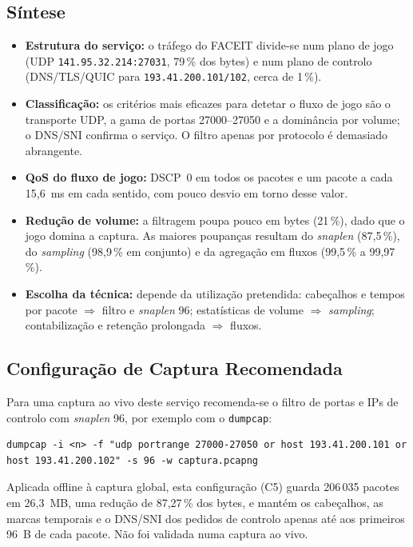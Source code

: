 \documentclass[11pt,a4paper]{article}
\begin{document}
\subsection{Síntese}
\begin{itemize}
  \item \textbf{Estrutura do serviço:} o tráfego do FACEIT divide-se num plano de jogo (UDP \texttt{141.95.32.214:27031}, 79\,\%
        dos bytes) e num plano de controlo (DNS/TLS/QUIC para \texttt{193.41.200.101/102}, cerca de 1\,\%).
  \item \textbf{Classificação:} os critérios mais eficazes para detetar o fluxo de jogo são o transporte UDP, a gama de portas
        27000--27050 e a dominância por volume; o DNS/SNI confirma o serviço. O filtro apenas por protocolo é demasiado abrangente.
  \item \textbf{QoS do fluxo de jogo:} DSCP~0 em todos os pacotes e um pacote a cada 15,6~ms em cada sentido, com pouco desvio
        em torno desse valor.
  \item \textbf{Redução de volume:} a filtragem poupa pouco em bytes (21\,\%), dado que o jogo domina a captura. As maiores
        poupanças resultam do \emph{snaplen} (87,5\,\%), do \emph{sampling} (98,9\,\% em conjunto) e da agregação em fluxos
        (99,5\,\% a 99,97\,\%).
  \item \textbf{Escolha da técnica:} depende da utilização pretendida: cabeçalhos e tempos por pacote $\Rightarrow$ filtro e
        \emph{snaplen} 96; estatísticas de volume $\Rightarrow$ \emph{sampling}; contabilização e retenção prolongada
        $\Rightarrow$ fluxos.
\end{itemize}

\subsection{Configuração de Captura Recomendada}
Para uma captura ao vivo deste serviço recomenda-se o filtro de portas e IPs de controlo com \emph{snaplen} 96, por exemplo
com o \texttt{dumpcap}:
\begin{lstlisting}
dumpcap -i <n> -f "udp portrange 27000-27050 or host 193.41.200.101 or host 193.41.200.102" -s 96 -w captura.pcapng
\end{lstlisting}
Aplicada offline à captura global, esta configuração (C5) guarda 206\,035 pacotes em 26,3~MB, uma redução de 87,27\,\% dos
bytes, e mantém os cabeçalhos, as marcas temporais e o DNS/SNI dos pedidos de controlo apenas até aos primeiros 96~B de cada
pacote. Não foi validada numa captura ao vivo.
\end{document}
